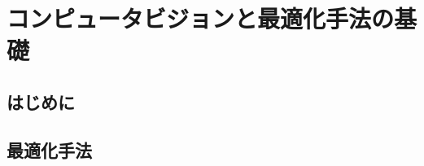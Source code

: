 \chapter{コンピュータビジョンと最適化手法の基礎}
\setcounter{page}{1}
\renewcommand{\thepage}{A--\arabic{page}}

\thispagestyle{empty}

\newpage
\section{はじめに}


\newpage

\section{最適化手法}


\newpage


